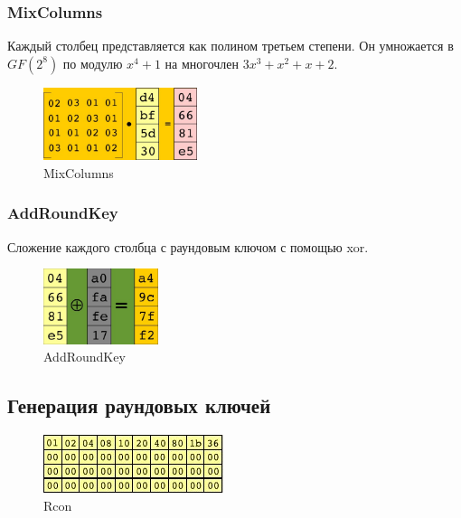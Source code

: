 \documentclass[a4paper, 14pt]{extarticle}
\begin{document}
\subsubsection{MixColumns}
Каждый столбец представляется как полином третьем степени. Он умножается в $GF(2^8)$ по модулю $x^4 + 1$ на многочлен $3x^3 + x^2 + x + 2$.
\begin{figure}[h]
    \centering
    \includegraphics[width=0.4\textwidth]{img/S008.jpg}
    \caption{MixColumns}
\end{figure}

\FloatBarrier{}
\subsubsection{AddRoundKey}
Сложение каждого столбца с раундовым ключом с помощью xor.

\begin{figure}[h]
    \centering
    \includegraphics[width=0.3\textwidth]{img/S009.jpg}
    \caption{AddRoundKey}
\end{figure}

\FloatBarrier{}
\subsection{Генерация раундовых ключей}%
\label{subsec:theory_end}
\begin{figure}[h]
    \centering
    \includegraphics{img/S010.jpg}
    \caption{Rcon}
\end{figure}
\end{document}

